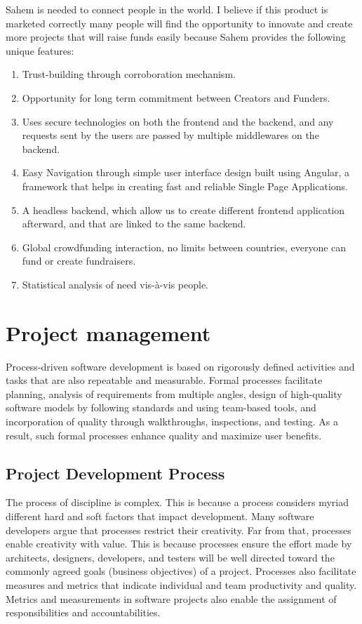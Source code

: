 Sahem is needed to connect people in the world. I believe if this product is marketed correctly many people will find the opportunity to innovate and create more projects that will raise funds easily because Sahem provides the following unique features:
\begin{enumerate}
      \item
            Trust-building through corroboration mechanism.
      \item
            Opportunity for long term commitment between Creators and Funders.
      \item
            Uses secure technologies on both the frontend and the backend, and any requests sent by the users are passed by multiple middlewares on the backend.
      \item
            Easy Navigation through simple user interface design built using Angular, a framework that helps in creating fast and reliable Single Page Applications.
      \item
            A headless backend, which allow us to create different frontend application afterward, and that are linked to the same backend.
      \item
            Global crowdfunding interaction, no limits between countries, everyone can fund or create fundraisers.
      \item
            Statistical analysis of need vis-à-vis people.
\end{enumerate}
\section*{ Project management }
Process-driven software development is based on rigorously defined activities and tasks that are also repeatable and measurable. Formal processes facilitate planning, analysis of requirements from multiple angles, design of high-quality software models by following standards and using team-based tools, and incorporation of quality through walkthroughs, inspections, and testing.
As a result, such formal processes enhance quality and maximize user benefits.
\subsection*{ Project Development Process }
The process of discipline is complex. This is because a process considers myriad different hard and soft factors that impact development. Many software developers argue that processes restrict their creativity. Far from that, processes enable creativity with value. This is because processes ensure the effort made by architects, designers, developers, and testers will be well directed toward the commonly agreed goals (business objectives) of a project. Processes also facilitate measures and metrics that indicate individual and team productivity and quality. Metrics and measurements in software projects also enable the assignment of responsibilities and accountabilities.
